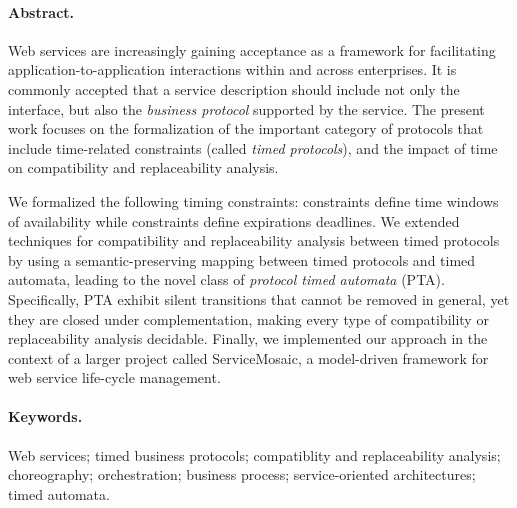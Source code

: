 
\paragraph{Abstract.}

Web services are increasingly gaining acceptance as a framework for facilitating
application-to-application interactions within and across enterprises. It is commonly accepted that a service description should include not only the interface, but also the \emph{business protocol} supported by the service. The present work focuses on the formalization of the important category of protocols that include time-related constraints (called \emph{timed protocols}), and the impact of time on compatibility and replaceability analysis.

We formalized the following timing constraints: \CInvoke constraints define time windows of availability while \MInvoke constraints define expirations deadlines. We extended techniques for compatibility and replaceability analysis between timed protocols by using a semantic-preserving mapping between timed protocols and timed automata, leading to the novel class of \emph{protocol timed automata} (PTA). Specifically, PTA exhibit silent transitions that cannot be removed in general, yet they are closed under complementation, making every type of compatibility or replaceability analysis decidable. Finally, we implemented our approach in the context of a larger project called ServiceMosaic, a model-driven framework for web service life-cycle management.

\paragraph{Keywords.}
Web services; timed business protocols; compatiblity and replaceability analysis; choreography; orchestration; business process; service-oriented architectures; timed automata.

